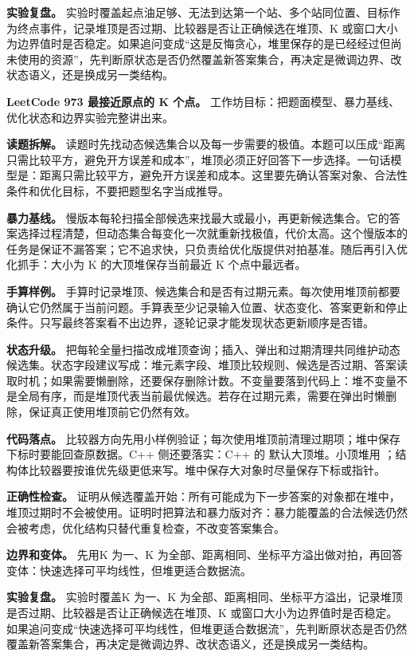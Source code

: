 \textbf{实验复盘。} 实验时覆盖起点油足够、无法到达第一个站、多个站同位置、目标作为终点事件，记录堆顶是否过期、比较器是否让正确候选在堆顶、K 或窗口大小为边界值时是否稳定。如果追问变成“这是反悔贪心，堆里保存的是已经经过但尚未使用的资源”，先判断原状态是否仍然覆盖新答案集合，再决定是微调边界、改状态语义，还是换成另一类结构。

\noindent\textbf{LeetCode 973 最接近原点的 K 个点。} 工作坊目标：把题面模型、暴力基线、优化状态和边界实验完整讲出来。

\textbf{读题拆解。} 读题时先找动态候选集合以及每一步需要的极值。本题可以压成“距离只需比较平方，避免开方误差和成本”，堆顶必须正好回答下一步选择。一句话模型是：距离只需比较平方，避免开方误差和成本。这里要先确认答案对象、合法性条件和优化目标，不要把题型名字当成推导。

\textbf{暴力基线。} 慢版本每轮扫描全部候选来找最大或最小，再更新候选集合。它的答案选择过程清楚，但动态集合每变化一次就重新找极值，代价太高。这个慢版本的任务是保证不漏答案；它不追求快，只负责给优化版提供对拍基准。随后再引入优化抓手：大小为 K 的大顶堆保存当前最近 K 个点中最远者。

\textbf{手算样例。} 手算时记录堆顶、候选集合和是否有过期元素。每次使用堆顶前都要确认它仍然属于当前问题。手算表至少记录输入位置、状态变化、答案更新和停止条件。只写最终答案看不出边界，逐轮记录才能发现状态更新顺序是否错。

\textbf{状态升级。} 把每轮全量扫描改成堆顶查询；插入、弹出和过期清理共同维护动态候选集。状态字段建议写成：堆元素字段、堆顶比较规则、候选是否过期、答案读取时机；如果需要懒删除，还要保存删除计数。不变量要落到代码上：堆不变量不是全局有序，而是堆顶代表当前最优候选。若存在过期元素，需要在弹出时懒删除，保证真正使用堆顶前它仍然有效。

\textbf{代码落点。} 比较器方向先用小样例验证；每次使用堆顶前清理过期项；堆中保存下标时要能回查原数据。C++ 侧还要落实：C++ 的  默认大顶堆。小顶堆用 ；结构体比较器要按谁优先级更低来写。堆中保存大对象时尽量保存下标或指针。

\textbf{正确性检查。} 证明从候选覆盖开始：所有可能成为下一步答案的对象都在堆中，堆顶过期时不会被使用。证明时把算法和暴力版对齐：暴力能覆盖的合法候选仍然会被考虑，优化结构只替代重复检查，不改变答案集合。

\textbf{边界和变体。} 先用K 为一、K 为全部、距离相同、坐标平方溢出做对拍，再回答变体：快速选择可平均线性，但堆更适合数据流。

\textbf{实验复盘。} 实验时覆盖K 为一、K 为全部、距离相同、坐标平方溢出，记录堆顶是否过期、比较器是否让正确候选在堆顶、K 或窗口大小为边界值时是否稳定。如果追问变成“快速选择可平均线性，但堆更适合数据流”，先判断原状态是否仍然覆盖新答案集合，再决定是微调边界、改状态语义，还是换成另一类结构。

